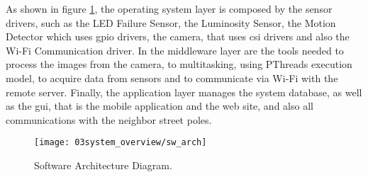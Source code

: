 As shown in figure \ref{fig:sw_arch}, the operating system layer is composed by the sensor drivers, such as the LED Failure Sensor, the Luminosity Sensor, the Motion Detector which uses \ac{gpio} drivers, the camera, that uses \ac{csi} drivers and also the Wi-Fi Communication driver. In the middleware layer are the tools needed to process the images from the camera, to multitasking, using PThreads execution model, to acquire data from sensors and to communicate via Wi-Fi with the remote server. Finally, the application layer manages the system database, as well as the \ac{gui}, that is the mobile application and the web site, and also all communications with the neighbor street poles.

\begin{figure}[ht]
	\centering
	\texttt{[image: 03system\_overview/sw\_arch]}
	\caption{Software Architecture Diagram.}
	\label{fig:sw_arch}
\end{figure}
